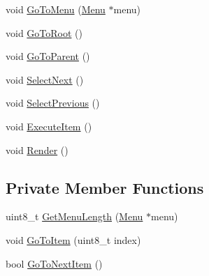 \begin{DoxyCompactItemize}
\item 
void \hyperlink{class_menu_1_1_controller_a1df8e49520c77372d479903c3ec93341}{Go\+To\+Menu} (\hyperlink{struct_menu_1_1_menu}{Menu} $\ast$menu)
\item 
void \hyperlink{class_menu_1_1_controller_a787911ef46ca1968c2fd667af1f9ac27}{Go\+To\+Root} ()
\item 
void \hyperlink{class_menu_1_1_controller_ab30a038c4e4e3cb102d419c11a6813f6}{Go\+To\+Parent} ()
\item 
void \hyperlink{class_menu_1_1_controller_a9aabc6ba652c29efa7a02e12f51ce0b1}{Select\+Next} ()
\item 
void \hyperlink{class_menu_1_1_controller_a04e3448cfe4341ad7209a9f16bbcb449}{Select\+Previous} ()
\item 
void \hyperlink{class_menu_1_1_controller_a0dda40652b8802a8fe39c1ce61a66f1a}{Execute\+Item} ()
\item 
void \hyperlink{class_menu_1_1_controller_af46abb3d242c76822c0e8ea8ab777fa5}{Render} ()
\end{DoxyCompactItemize}
\subsection*{Private Member Functions}
\begin{DoxyCompactItemize}
\item 
uint8\+\_\+t \hyperlink{class_menu_1_1_controller_a24009cee76b147079041b2130a806027}{Get\+Menu\+Length} (\hyperlink{struct_menu_1_1_menu}{Menu} $\ast$menu)
\item 
void \hyperlink{class_menu_1_1_controller_afa4a1e26efe90dd5d9479bb8c84404b6}{Go\+To\+Item} (uint8\+\_\+t index)
\item 
bool \hyperlink{class_menu_1_1_controller_ad93989bb6a9ed55f67ad5c15e666cf39}{Go\+To\+Next\+Item} ()
\end{DoxyCompactItemize}
